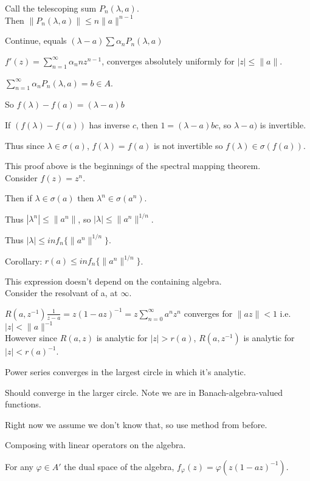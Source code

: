 \documentclass[12pt]{article}
\newcommand{\inv}{^{-1}}
\begin{document}
Call the telescoping sum $P_n(\lambda, a)$.\\

Then $\|P_n(\lambda, a)\| \leq n\|a\|^{n - 1}$

Continue, equals $(\lambda - a) \sum \alpha_n P_n(\lambda, a)$

$f'(z) = \sum_{n = 1}^\infty \alpha_n n z^{n - 1}$, converges absolutely uniformly for $|z| \leq \|a\|$.

$\sum_{n = 1}^\infty \alpha_nP_n(\lambda, a) = b \in A$.

So $f(\lambda) - f(a) = (\lambda - a)b$

If $(f(\lambda) - f(a))$ has inverse $c$, then $1 = (\lambda - a)bc$, so $\lambda - a)$ is invertible.

Thus since $\lambda \in \sigma(a)$, $f(\lambda) = f(a)$ is not invertible so $f(\lambda) \in \sigma(f(a))$.

\noindent
This proof above is the beginnings of the spectral mapping theorem.\\

Consider $f(z) = z^n$.

Then if $\lambda \in \sigma(a)$ then $\lambda^n \in \sigma(a^n)$.

Thus $|\lambda^n| \leq \|a^n\|$, so $|\lambda| \leq \|a^n\|^{1/n}$.

Thus $|\lambda| \leq inf_n\{\|a^n\|^{1/n}\}$.

\noindent
Corollary: $r(a) \leq inf_n\{\|a^n\|^{1/n}\}$.

This expression doesn't depend on the containing algebra.\\

\noindent
Consider the resolvant of a, at $\infty$.

$R(a, z^{-1}) \frac{1}{z - a} = z(1 - az)\inv = z\sum_{n = 0}^\infty a^nz^n$ converges for $\|az\| < 1$ i.e. $|z| < \|a\|^{-1}$\\

\noindent
However since $R(a, z)$ is analytic for $|z| > r(a)$, $R(a, z^{-1})$ is analytic for $|z| < r(a)\inv$.

Power series converges in the largest circle in which it's analytic.

Should converge in the larger circle.  Note we are in Banach-algebra-valued functions.

Right now we assume we don't know that, so use method from before.

Composing with linear operators on the algebra.

For any $\varphi \in A'$ the dual space of the algebra, $f_\varphi(z) = \varphi(z(1 - az)\inv)$.
\end{document}
